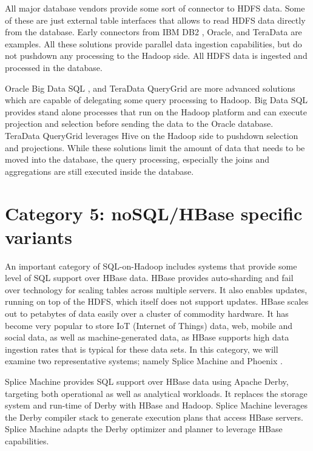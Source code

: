 \documentclass{vldb}
\begin{document}
All major database vendors provide some sort of connector to HDFS data. Some of these are just external table interfaces that allows to read HDFS data directly from the database. Early connectors from IBM DB2 \cite{ibm-sigmod2011}, Oracle, and TeraData are examples.
All these solutions provide parallel data ingestion capabilities, but do not pushdown any processing to the Hadoop side. All HDFS data is ingested and processed in the database.

Oracle Big Data SQL \cite{bigdataSQL}, and TeraData QueryGrid \cite{queryGrid} are more advanced solutions which are capable of delegating some query processing to Hadoop. Big Data SQL provides stand alone processes that run on the Hadoop platform and can execute projection and selection before sending the data to the Oracle database. TeraData QueryGrid leverages Hive on the Hadoop side to pushdown selection and projections. While these solutions limit the amount of data that needs to be moved into the database, the query processing, especially the joins and aggregations are still executed inside the database.

\section{Category 5: noSQL/HBase specific variants}

An important category of SQL-on-Hadoop includes systems that provide some level of SQL support over HBase data. HBase provides auto-sharding and fail over technology for scaling tables across multiple servers. It also enables updates, running on top of the HDFS, which itself does not support updates. HBase scales out to petabytes of data easily over a cluster of commodity hardware. It has become very popular to store IoT (Internet of Things) data, web, mobile and social data, as well as machine-generated data, as HBase supports high data ingestion rates that is typical for these data sets. In this category, we will examine two representative systems; namely Splice Machine \cite{splice} and Phoenix \cite{phoenix}. 

Splice Machine \cite{splice} provides SQL support over HBase data using Apache Derby, targeting both operational as well as analytical workloads. It replaces the storage system and run-time of Derby with HBase and Hadoop. Splice Machine leverages the Derby compiler stack to generate execution plans that access HBase servers. Splice Machine adapts the Derby optimizer and planner to leverage HBase capabilities. 




\balance
\end{document}
